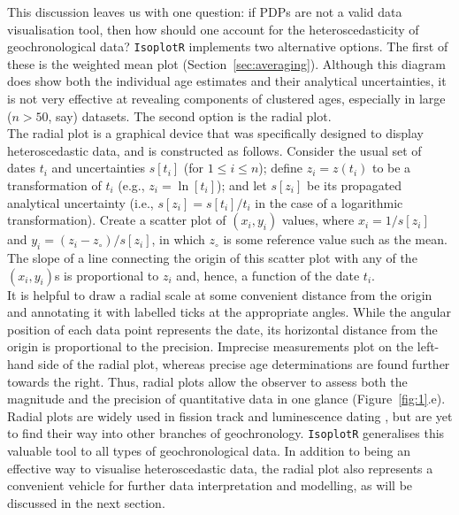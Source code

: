 \documentclass{article}
\begin{document}
This discussion leaves us with one question: if PDPs are not a valid
data visualisation tool, then how should one account for the
heteroscedasticity of geochronological data?  \texttt{IsoplotR}
implements two alternative options. The first of these is the weighted
mean plot (Section~\ref{sec:averaging}).  Although this diagram does
show both the individual age estimates and their analytical
uncertainties, it is not very effective at revealing components of
clustered ages, especially in large ($n>50$, say) datasets. The second
option is the radial plot.\\

The radial plot is a graphical device that was specifically designed
to display heteroscedastic data, and is constructed as follows.
Consider the usual set of dates $t_i$ and uncertainties $s[t_i]$ (for
$1 \leq i \leq n$); define $z_i = z(t_i)$ to be a transformation of
$t_i$ (e.g., $z_i = \ln[t_i]$); and let $s[z_i]$ be its propagated
analytical uncertainty (i.e., $s[z_i] = s[t_i]/t_i$ in the case of a
logarithmic transformation). Create a scatter plot of $(x_i,y_i)$
values, where $x_i = 1/s[z_i]$ and $y_i = (z_i-z_\circ)/s[z_i]$, in
which $z_\circ$ is some reference value such as the mean. The slope of
a line connecting the origin of this scatter plot with any of the
$(x_i,y_i)$s is proportional to $z_i$ and, hence, a function of the
date $t_i$.\\

It is helpful to draw a radial scale at
some convenient distance from the origin and annotating it with
labelled ticks at the appropriate angles. While the angular position
of each data point represents the date, its horizontal distance from
the origin is proportional to the precision. Imprecise measurements
plot on the left-hand side of the radial plot, whereas precise age
determinations are found further towards the right. Thus, radial plots
allow the observer to assess both the magnitude and the precision of
quantitative data in one glance (Figure~\ref{fig:1}.e).\\

Radial plots are widely used in fission track and luminescence dating
\citep{galbraith1990a, galbraith1999}, but are yet to find their way
into other branches of geochronology. \texttt{IsoplotR} generalises
this valuable tool to all types of geochronological data.  In addition
to being an effective way to visualise heteroscedastic data, the
radial plot also represents a convenient vehicle for further data
interpretation and modelling, as will be discussed in the next
section.
\end{document}
